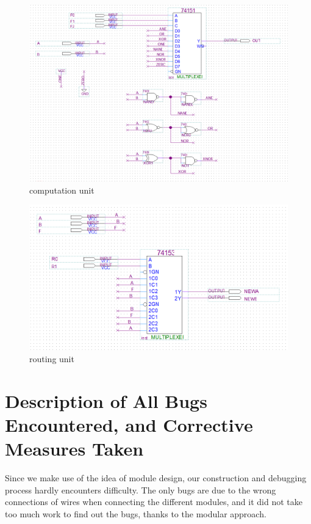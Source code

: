 \documentclass[12pt]{article}
\begin{document}
\begin{figure}[H]
    \centering
    \includegraphics[width=16cm]{computation_unit.png}
    \caption{computation unit}
\end{figure}
\begin{figure}[H]
    \centering
    \includegraphics[width=15cm]{routing_unit.png}
    \caption{routing unit}
\end{figure}

\section{Description of All Bugs Encountered, and Corrective Measures Taken}
Since we make use of the idea of module design, our construction and debugging process hardly encounters difficulty. The only bugs are due to the wrong connections of wires when connecting the different modules, and it did not take too much work to find out the bugs, thanks to the modular approach.
\end{document}
